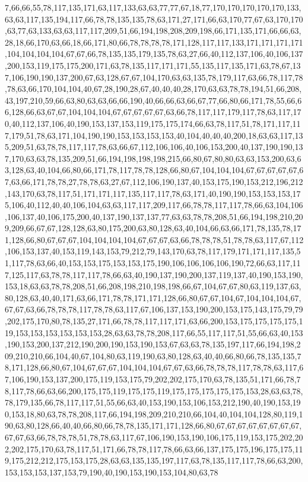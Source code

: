 7,66,66,55,78,117,135,171,63,117,133,63,63,77,77,67,18,77,170,170,170,170,170,133,63,63,117,135,194,117,66,78,78,135,135,78,63,171,27,171,66,63,170,77,67,63,170,170,63,77,63,133,63,63,117,117,209,51,66,194,198,208,209,198,66,171,135,171,66,66,63,28,18,66,170,63,66,18,66,171,80,66,78,78,78,78,171,128,117,117,133,171,171,171,171,104,104,104,104,67,67,66,78,135,135,179,135,78,63,27,66,40,112,137,106,40,106,137,200,153,119,175,175,200,171,63,78,135,117,171,171,55,135,117,135,171,63,78,67,137,106,190,190,137,200,67,63,128,67,67,104,170,63,63,135,78,179,117,63,66,78,117,78,78,63,66,170,104,104,40,67,28,190,28,67,40,40,40,28,170,63,63,78,78,194,51,66,208,43,197,210,59,66,63,80,63,63,66,66,190,40,66,66,63,66,67,77,66,80,66,171,78,55,66,66,128,66,63,67,67,104,104,104,67,67,67,67,67,63,66,78,117,117,179,117,78,63,117,170,40,112,137,106,40,190,153,137,153,119,175,175,174,66,63,78,117,51,78,171,117,117,179,51,78,63,171,104,190,190,153,153,153,153,40,104,40,40,40,200,18,63,63,117,135,209,51,63,78,78,117,117,78,63,66,67,112,106,106,40,106,153,200,40,137,190,190,137,170,63,63,78,135,209,51,66,194,198,198,198,215,66,80,67,80,80,63,63,153,200,63,63,128,63,40,104,66,80,66,171,78,117,78,78,128,66,80,67,104,104,104,67,67,67,67,67,67,63,66,171,78,78,27,78,78,63,27,67,112,106,190,137,40,153,175,190,153,212,196,212,143,170,63,78,117,51,171,171,117,135,117,117,78,63,171,40,190,190,153,153,153,175,106,40,112,40,40,106,104,63,63,117,117,209,117,66,78,78,117,117,78,66,63,104,106,106,137,40,106,175,200,40,137,190,137,137,77,63,63,78,78,208,51,66,194,198,210,209,209,66,67,67,128,128,63,80,175,200,63,80,128,63,40,104,66,63,66,171,78,135,78,171,128,66,80,67,67,67,104,104,104,104,67,67,67,63,66,78,78,78,51,78,78,63,117,67,112,106,153,137,40,153,119,143,153,79,212,79,143,170,63,78,117,179,171,171,117,135,51,117,78,63,66,40,153,153,175,153,153,175,190,106,106,106,106,190,72,66,63,117,117,125,117,63,78,78,117,117,78,66,63,40,190,137,190,200,137,119,137,40,190,153,190,153,18,63,63,78,78,208,51,66,208,198,210,198,198,66,67,104,67,67,80,63,119,137,63,80,128,63,40,40,171,63,66,171,78,78,171,171,128,66,80,67,67,104,67,104,104,104,67,67,67,63,66,78,78,78,117,78,78,63,117,67,106,137,153,190,200,153,175,143,175,79,79,202,175,170,80,78,135,27,171,66,78,78,117,117,171,63,66,200,153,175,175,175,175,119,153,153,153,153,153,153,28,63,63,78,78,208,117,66,55,117,117,51,55,66,63,40,153,190,153,200,137,212,190,200,190,153,190,153,67,63,63,78,135,197,117,66,194,198,209,210,210,66,104,40,67,104,80,63,119,190,63,80,128,63,40,40,66,80,66,78,135,135,78,171,128,66,80,67,104,67,67,67,104,104,104,67,67,63,66,78,78,78,117,78,78,63,117,67,106,190,153,137,200,175,119,153,175,79,202,202,175,170,63,78,135,51,171,66,78,78,117,78,66,63,66,200,175,175,119,175,175,119,175,175,175,175,175,153,28,63,63,78,78,179,135,66,78,117,117,51,55,66,63,40,153,190,153,106,153,212,190,40,190,153,190,153,18,80,63,78,78,208,117,66,194,198,209,210,210,66,104,40,104,104,128,80,119,190,63,80,128,66,40,40,66,80,66,78,78,135,171,171,128,66,80,67,67,67,67,67,67,67,67,67,67,63,66,78,78,78,51,78,78,63,117,67,106,190,153,190,106,175,119,153,175,202,202,202,175,170,63,78,117,51,171,66,78,78,117,78,66,63,66,137,175,175,196,175,175,119,175,212,212,175,153,175,28,63,63,135,135,197,117,63,78,135,117,117,78,66,63,200,153,153,153,137,153,79,190,40,190,153,190,153,104,80,63,78